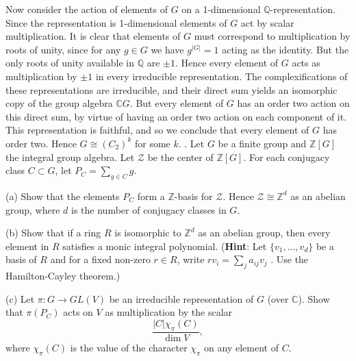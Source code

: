 \documentclass[11pt]{article}
\newcommand{\Z}{\mathbb{Z}}
\newcommand{\Q}{\mathbb{Q}}
\newcommand{\C}{\mathbb{C}}
\begin{document}
Now consider the action of elements of $G$ on a 1-dimensional $\Q$-representation. Since the representation is 1-dimensional elements of $G$ act by scalar multiplication. It is clear that elements of $G$ must correspond to multiplication by roots of unity, since for any $g\in G$ we have $g^{|G|} = 1$ acting as the identity. But the only roots of unity available in $\Q$ are $\pm 1$. Hence every element of $G$ acts as multiplication by $\pm 1$ in every irreducible representation. The complexifications of these representations are irreducible, and their direct sum yields an isomorphic copy of the group algebra $\C G$. But every element of $G$ has an order two action on this direct sum, by virtue of having an order two action on each component of it. This representation is faithful, and so we conclude that every element of $G$ has order two. Hence $G\cong (C_2)^k$ for some $k$. 
. Let $G$ be a finite group and $\Z[G]$ the integral group algebra. Let $\mathcal Z$ be the center of
$\Z[G]$. For each conjugacy class $C\subset G$, let $P_C = \sum_{g\in C} g$. 

(a) Show that the elements $P_C$ form a $\Z$-basis for $\mathcal Z$. Hence $\mathcal Z\cong \Z^d$ as an abelian
group, where $d$ is the number of conjugacy classes in $G$.

(b) Show that if a ring $R$ is isomorphic to $\Z^d$ as an abelian group, then every element
in $R$ satisfies a monic integral polynomial. (\textbf{Hint}: Let $\{v_1, . . . , v_d\}$ be a basis of
$R$ and for a fixed non-zero $r\in R$, write $rv_i = \sum_j a_{ij} v_j$
. Use the Hamilton-Cayley
theorem.)

(c) Let $\pi : G \to GL(V )$ be an irreducible representation of $G$ (over $\C$). Show that
$\pi(P_C)$ acts on $V$ as multiplication by the scalar\[
\frac{|C|\chi_\pi(C)}{\dim V},\]
where $\chi_\pi(C)$  is the value of the character $\chi_\pi$ on any element of $C$.
\end{document}
